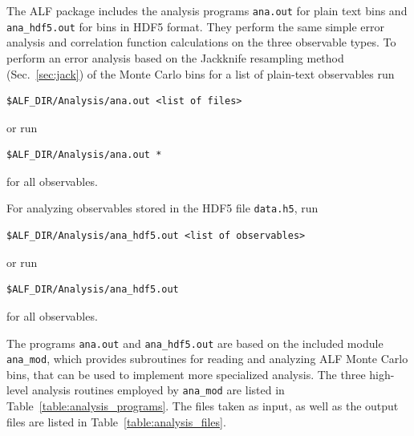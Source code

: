 The ALF package includes the analysis programs \texttt{ana.out} for plain text bins and \texttt{ana\_hdf5.out} for bins in HDF5 format. They perform the same simple error analysis and correlation function calculations on the three observable types. To perform an error analysis based on the Jackknife resampling method~\cite{efron1981} (Sec.~\ref{sec:jack}) of the Monte Carlo bins for a list of plain-text observables run
\begin{lstlisting}[style=bash]
$ALF_DIR/Analysis/ana.out <list of files>
\end{lstlisting}
or run
\begin{lstlisting}[style=bash]
$ALF_DIR/Analysis/ana.out *
\end{lstlisting}
for all observables.

For analyzing observables stored in the HDF5 file \texttt{data.h5}, run
\begin{lstlisting}[style=bash]
$ALF_DIR/Analysis/ana_hdf5.out <list of observables>
\end{lstlisting}
or run
\begin{lstlisting}[style=bash]
$ALF_DIR/Analysis/ana_hdf5.out
\end{lstlisting}
for all observables.

The programs \texttt{ana.out} and \texttt{ana\_hdf5.out} are based on the included module \texttt{ana\_mod}, which provides subroutines for reading and analyzing ALF Monte Carlo bins, that can be used to implement more specialized analysis. The three high-level analysis routines employed by \texttt{ana\_mod} are listed in Table~\ref{table:analysis_programs}. The files taken as input, as well as the output files are listed in Table~\ref{table:analysis_files}.

